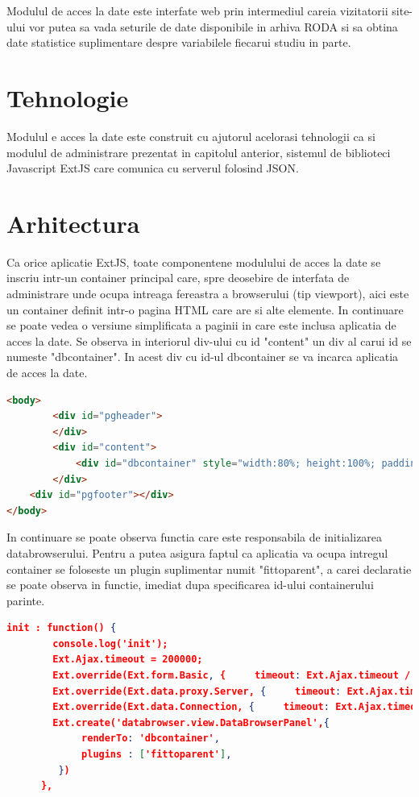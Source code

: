 
Modulul de acces la date este interfate web prin intermediul careia vizitatorii site-ului vor putea sa vada seturile de date disponibile in arhiva RODA si sa obtina date statistice suplimentare despre variabilele fiecarui studiu in parte. 

\section{Tehnologie}

Modulul e acces la date este construit cu ajutorul acelorasi tehnologii ca si modulul de administrare prezentat in capitolul anterior, sistemul de biblioteci Javascript ExtJS care comunica cu serverul folosind JSON. 


\section{Arhitectura}

Ca orice aplicatie ExtJS, toate componentene modulului de acces la date se inscriu intr-un container principal care, spre deosebire de interfata de administrare unde ocupa intreaga fereastra a browserului (tip viewport), aici este un container definit intr-o pagina HTML care are si alte elemente. In continuare se poate vedea o versiune simplificata a paginii in care este inclusa aplicatia de acces la date. Se observa in interiorul div-ului cu id "content" un div al carui id se numeste "dbcontainer". 
In acest div cu id-ul dbcontainer se va incarca aplicatia de acces la date.

\begin{lstlisting}[language=HTML]
<body>
		<div id="pgheader">
		</div>
		<div id="content">
			<div id="dbcontainer" style="width:80%; height:100%; padding: 0; margin-left:auto; margin-right:auto;"></div>
	 	</div>
	<div id="pgfooter"></div>
</body>
\end{lstlisting}

In continuare se poate observa functia care este responsabila de initializarea databrowserului. Pentru a putea asigura faptul ca aplicatia va ocupa intregul container se foloseste un plugin suplimentar numit "fittoparent", a carei declaratie se poate observa in functie, imediat dupa specificarea id-ului containerului parinte. 


\begin{lstlisting}[language=json]
    init : function() {  	
    	console.log('init');
    	Ext.Ajax.timeout = 200000; 
	    Ext.override(Ext.form.Basic, {     timeout: Ext.Ajax.timeout / 1000 });
	    Ext.override(Ext.data.proxy.Server, {     timeout: Ext.Ajax.timeout });
	    Ext.override(Ext.data.Connection, {     timeout: Ext.Ajax.timeout });
	    Ext.create('databrowser.view.DataBrowserPanel',{
	         renderTo: 'dbcontainer',
	         plugins : ['fittoparent'],
	     })
	  },
\end{lstlisting}

